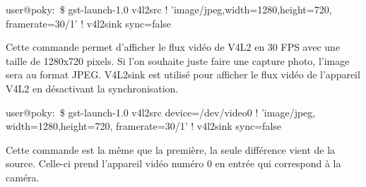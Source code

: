 \begin{tcolorbox}
user@poky:~\$ gst-launch-1.0 v4l2src ! 'image/jpeg,width=1280,height=720, \\ 
framerate=30/1' ! v4l2sink sync=false
\end{tcolorbox}

Cette commande permet d’afficher le flux vidéo de V4L2 en 30 FPS avec une taille de
1280x720 pixels. Si l’on souhaite juste faire une capture photo, l’image sera au format
JPEG. V4L2sink est utilisé pour afficher le flux vidéo de l’appareil V4L2 en désactivant la
synchronisation.

\begin{tcolorbox}
user@poky:~\$ gst-launch-1.0 v4l2src device=/dev/video0 ! 'image/jpeg, \\
width=1280,height=720, framerate=30/1' ! v4l2sink sync=false
\end{tcolorbox}

Cette commande est la même que la première, la seule différence vient de la source.
Celle-ci prend l’appareil vidéo numéro 0 en entrée qui correspond à la caméra.